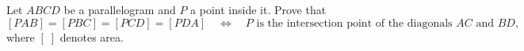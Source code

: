 Let $ABCD$ be a parallelogram and $P$ a point inside it. Prove that
\[
[PAB]=[PBC]=[PCD]=[PDA]\quad\Longleftrightarrow\quad P\text{ is the intersection point of the diagonals }AC\text{ and }BD,
\]
where $[\;]$ denotes area.
